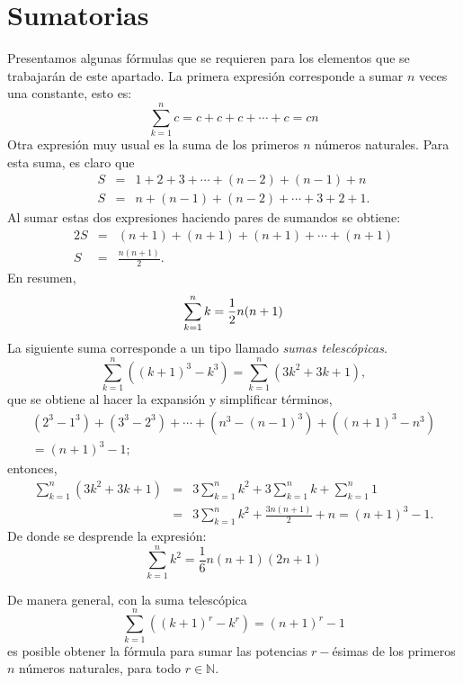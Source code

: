 \section{Sumatorias}

Presentamos algunas fórmulas que se requieren para los elementos que se trabajarán de este apartado. La primera expresión corresponde a sumar $n$ veces una constante, esto es:
\begin{equation} \label{sumas}
  \sum_{k=1}^{n}c= c+c+c+\cdots +c= cn
\end{equation}
Otra expresión muy usual es la suma de los primeros $n$ números naturales. Para esta suma, es claro que
\begin{eqnarray*}
  S &=& 1+2+3+\cdots +\left( n-2\right) +\left( n-1\right) +n \\
  S &=& n+\left( n-1\right) +\left( n-2\right) +\cdots +3+2+1.
\end{eqnarray*}
Al sumar estas dos expresiones haciendo pares de sumandos se obtiene:
\begin{eqnarray*}
  2S &=& ( n+1) +(n+1)+(n+1) +\cdots +(n+1)\\
  S&=&\frac{n(n+1)}{2}.
\end{eqnarray*}
En resumen,
\begin{equation} \label{sumas1}
  \displaystyle\sum_{k=1}^{n}k= \frac{1}{2}n(n+1)
\end{equation}
La siguiente suma corresponde a un tipo llamado \emph{sumas telescópicas}. 
\[\sum_{k=1}^{n}\left( \left( k+1\right) ^{3}-k^{3}\right) =\sum_{k=1}^{n}\left( 3k^{2}+3k+1\right),\]
que se obtiene al hacer la expansión y simplificar términos,
\begin{multline*}
  \left(2^{3}-1^{3}\right) +\left( 3^{3}-2^{3}\right) +\cdots +\left( n^{3}-\left(
  n-1\right) ^{3}\right) +\left( (n+1) ^{3}-n^{3}\right)\\ = (n+1) ^{3}-1;
\end{multline*}
entonces,
\begin{eqnarray*}
  \sum_{k=1}^{n}\left( 3k^{2}+3k+1\right) &=& 3\sum_{k=1}^{n}k^{2}+3\sum_{k=1}^{n}k+\sum_{k=1}^{n}1 \\
  &=& 3\sum_{k=1}^{n}k^{2}+\frac{3n(n+1) }{2}+n = (n+1)^{3}-1.
\end{eqnarray*}
De donde se desprende la expresión:
\begin{equation} \label{sumas2}
  \sum_{k=1}^{n}k^{2}= \frac{1}{6}n(n+1) \left(2n+1\right)
\end{equation}
\begin{tcolorbox}
  De manera general, con la suma telescópica
  \[\sum\limits _{k=1}^{n}\left( \left(k+1\right) ^{r}-k^{r}\right) = (n+1) ^{r}-1\]
  es posible obtener la fórmula para sumar las potencias $r-$ésimas de los primeros $n$ números naturales,
  para todo $r\in \mathbb{N}$.
\end{tcolorbox}

